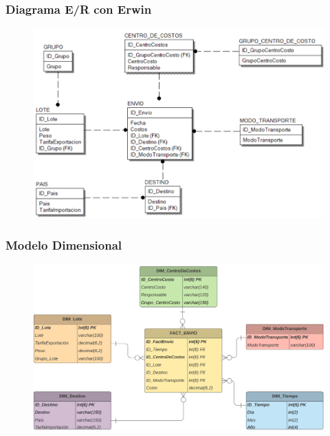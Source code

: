 \documentclass{article}
\begin{document}
\subsubsection{\textbf{Diagrama E/R con Erwin }}

	\begin{figure}[htb]
		\begin{center}
			\includegraphics[width=12cm]{./images/erwin_1}
			
		\end{center}
	\end{figure}

\newpage

\subsubsection{\textbf{Modelo Dimensional }}

	\begin{figure}[htb]
		\begin{center}
			\includegraphics[width=12.5cm]{./images/mod_dimensional_1}
			
		\end{center}
	\end{figure}
\end{document}
